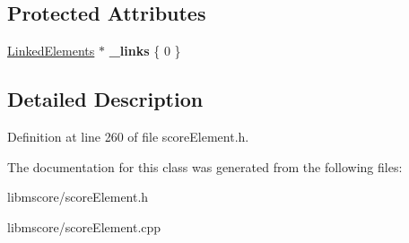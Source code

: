 \subsection*{Protected Attributes}
\begin{DoxyCompactItemize}
\item 
\mbox{\label{class_ms_1_1_score_element_a405b151c60a010237414678a0e0952af}} 
\hyperlink{class_ms_1_1_linked_elements}{Linked\+Elements} $\ast$ {\bfseries \+\_\+links} \{ 0 \}
\end{DoxyCompactItemize}


\subsection{Detailed Description}


Definition at line 260 of file score\+Element.\+h.



The documentation for this class was generated from the following files\+:\begin{DoxyCompactItemize}
\item 
libmscore/score\+Element.\+h\item 
libmscore/score\+Element.\+cpp\end{DoxyCompactItemize}
